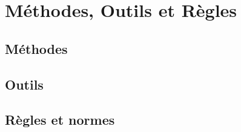 \section{Méthodes, Outils et Règles}

\subsection{Méthodes}

\subsection{Outils}

\subsection{Règles et normes}
